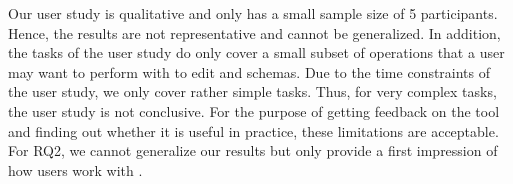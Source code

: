 Our user study is qualitative and only has a small sample size of 5 participants.
Hence, the results are not representative and cannot be generalized.
In addition, the tasks of the user study do only cover a small subset of operations
that a user may want to perform with \toolname{} to edit \cfgfiles{} and schemas.
Due to the time constraints of the user study, we only cover rather simple tasks.
Thus, for very complex tasks, the user study is not conclusive.
For the purpose of getting feedback on the tool and finding out whether it is useful in practice, these limitations are acceptable.
For RQ2, we cannot generalize our results but only provide a first impression of how users work with \toolname{}.




